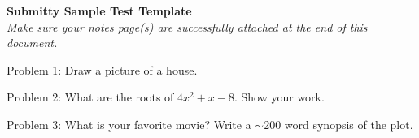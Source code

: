\documentclass[10pt]{article}
\begin{document}
\begin{center}
  {\LARGE \textbf {Submitty Sample Test Template}}
  \vspace{0.1in}
  \\ 
  {\em Make sure your notes page(s) are successfully attached at the end of this document.}
\end{center}

Problem 1: Draw a picture of a house.

\fbox{\parbox{6.9in}{ \ \vspace{4.1in} \ }}

\vspace{0.2in}



Problem 2: What are the roots of $ 4x^2 + x -8 $.  Show your work.

\fbox{\parbox{6.9in}{ \ \vspace{4.1in} \ }}

\newpage

Problem 3: What is your favorite movie?  Write a $\sim$200 word
synopsis of the plot.

\fbox{\parbox{6.9in}{ \ \vspace{9.5in} \ }}

\newpage



\end{document}
